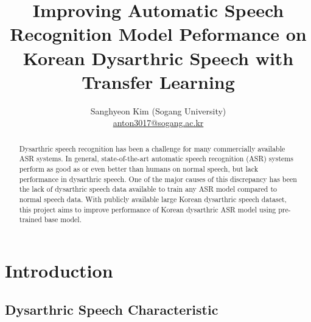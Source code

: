 \documentclass[9pt,final,a4paper]{IEEEtran}
\begin{document}
\title{\LARGE Improving Automatic Speech Recognition Model Peformance on Korean Dysarthric Speech with Transfer Learning}

\author{Sanghyeon Kim (Sogang University)\\ \href{mailto:anton3017@sogang.ac.kr}{anton3017@sogang.ac.kr}}

\maketitle

\begin{abstract}
    Dysarthric speech recognition has been a challenge for many commercially available ASR systems.
    In general, state-of-the-art automatic speech recognition (ASR) systems perform as good as or even better than humans on normal speech, but lack performance in dysarthric speech.
    One of the major causes of this discrepancy has been the lack of dysarthric speech data available to train any ASR model compared to normal speech data.
    With publicly available large Korean dysarthric speech dataset, this project aims to improve performance of Korean dysarthric ASR model using pre-trained base model.
\end{abstract}

\section{Introduction}

\subsection{Dysarthric Speech Characteristic}
\end{document}
